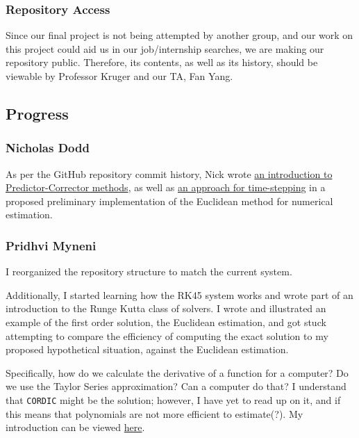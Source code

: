 \documentclass[12pt, letterpaper]{article}
\begin{document}
\subsubsection{Repository Access}
Since our final project is not being attempted by another group,  and our work on this project could aid us in our job/internship searches, we are making our repository public. Therefore, its contents, as well as its history, should be viewable by Professor Kruger and our TA, Fan Yang.

\subsection{Progress}
\subsubsection{Nicholas Dodd}
As per the GitHub repository commit history, Nick wrote \href{https://github.com/PMARINA/CPE593-FinalProject/blob/f8c679ad0c435e2d89354a87e111404e5477b096/Predictor\%20Corrector.pdf}{an introduction to Predictor-Corrector methods}, as well as \href{https://github.com/PMARINA/CPE593-FinalProject/blob/f8c679ad0c435e2d89354a87e111404e5477b096/Simple\%20Approach\%20For\%20Stepping\%20Time\%20Using\%20Euler.pdf}{an approach for time-stepping} in a proposed preliminary implementation of the Euclidean method for numerical estimation. 

\subsubsection{Pridhvi Myneni}
I reorganized the repository structure to match the current system. 

Additionally, I started learning how the RK45 system works and wrote part of an introduction to the Runge Kutta class of solvers. I wrote and illustrated an example of the first order solution, the Euclidean estimation, and got stuck attempting to compare the efficiency of computing the exact solution to my proposed hypothetical situation, against the Euclidean estimation. 

Specifically, how do we calculate the derivative of a function for a computer? Do we use the Taylor Series approximation? Can a computer do that? I understand that \texttt{CORDIC} might be the solution; however, I have yet to read up on it, and if this means that polynomials are not more efficient to estimate(?). My introduction can be viewed \href{https://github.com/PMARINA/CPE593-FinalProject/blob/9ab5c29673f9862f02e62eb5c33648d52db2cf95/docs/RK45.pdf}{here}.
\end{document}
